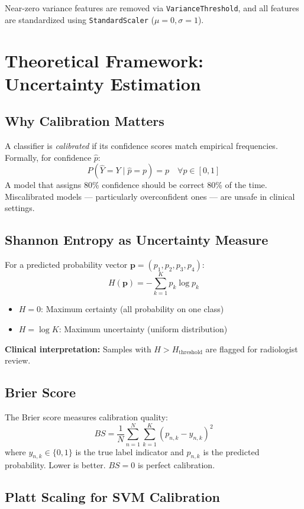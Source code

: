 \documentclass[12pt,a4paper]{article}
\begin{document}
Near-zero variance features are removed via \texttt{VarianceThreshold}, and all features are standardized using \texttt{StandardScaler} ($\mu=0, \sigma=1$).

\section{Theoretical Framework: Uncertainty Estimation}

\subsection{Why Calibration Matters}

A classifier is \textit{calibrated} if its confidence scores match empirical frequencies. Formally, for confidence $\hat{p}$:
\[
P(\hat{Y} = Y \mid \hat{p} = p) = p \quad \forall p \in [0,1]
\]
A model that assigns 80\% confidence should be correct 80\% of the time. Miscalibrated models — particularly overconfident ones — are unsafe in clinical settings.

\subsection{Shannon Entropy as Uncertainty Measure}

For a predicted probability vector $\mathbf{p} = (p_1, p_2, p_3, p_4)$:
\[
H(\mathbf{p}) = -\sum_{k=1}^{K} p_k \log p_k
\]
\begin{itemize}[noitemsep]
    \item $H = 0$: Maximum certainty (all probability on one class)
    \item $H = \log K$: Maximum uncertainty (uniform distribution)
\end{itemize}

\textbf{Clinical interpretation:} Samples with $H > H_{\text{threshold}}$ are flagged for radiologist review.

\subsection{Brier Score}

The Brier score measures calibration quality:
\[
BS = \frac{1}{N} \sum_{n=1}^{N} \sum_{k=1}^{K} (p_{n,k} - y_{n,k})^2
\]
where $y_{n,k} \in \{0,1\}$ is the true label indicator and $p_{n,k}$ is the predicted probability. Lower is better. $BS = 0$ is perfect calibration.

\subsection{Platt Scaling for SVM Calibration}
\end{document}
